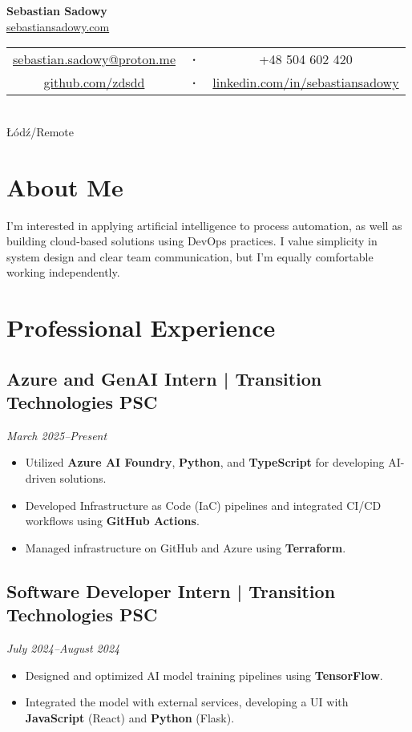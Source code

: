 \documentclass[a4paper,10pt]{article}
\begin{document}
\begin{center}
    {\Huge\textbf{Sebastian Sadowy}} \\[0.3cm]
    \href{https://sebastiansadowy.com}{sebastiansadowy.com} \\[0.2cm]
    \begin{tabular}{c c c}
        \href{mailto:sebastian.sadowy@proton.me}{sebastian.sadowy@proton.me} &
        \textbf{·} &
        +48 504 602 420 \\
        \href{https://github.com/zdsdd}{github.com/zdsdd} &
        \textbf{·} &
        \href{https://www.linkedin.com/in/sebastiansadowy}{linkedin.com/in/sebastiansadowy}
    \end{tabular} \\
    Łódź/Remote
\end{center}

\section{About Me}
I'm interested in applying artificial intelligence to process automation, as well as building cloud-based solutions using DevOps practices. I value simplicity in system design and clear team communication, but I’m equally comfortable working independently.

\section{Professional Experience}

\subsection{Azure and GenAI Intern | Transition Technologies PSC}
\textit{March 2025--Present}
\begin{itemize}[leftmargin=0.5cm, nosep]
    \item Utilized \textbf{Azure AI Foundry}, \textbf{Python}, and \textbf{TypeScript} for developing AI-driven solutions.
    \item Developed Infrastructure as Code (IaC) pipelines and integrated CI/CD workflows using \textbf{GitHub Actions}.
    \item Managed infrastructure on GitHub and Azure using \textbf{Terraform}.
\end{itemize}

\subsection{Software Developer Intern | Transition Technologies PSC}
\textit{July 2024--August 2024}
\begin{itemize}[leftmargin=0.5cm, nosep]
    \item Designed and optimized AI model training pipelines using \textbf{TensorFlow}.
    \item Integrated the model with external services, developing a UI with \textbf{JavaScript} (React) and \textbf{Python} (Flask).
\end{itemize}
\end{document}
